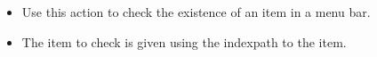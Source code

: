\begin{itemize}
\item Use this action to check the existence of an item in a menu bar.
\item The item to check is given using the indexpath to the item.
\end{itemize}
